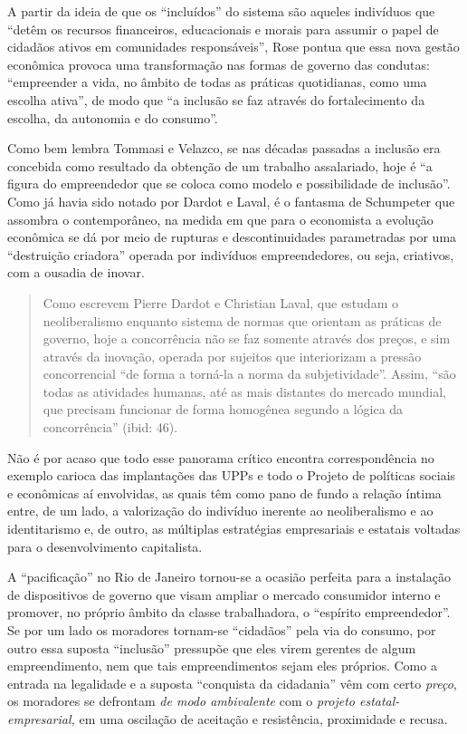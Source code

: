 A partir da ideia de que os ``incluídos'' do sistema são aqueles
indivíduos que ``detêm os recursos financeiros, educacionais e morais
para assumir o papel de cidadãos ativos em comunidades responsáveis'',
Rose pontua que essa nova gestão econômica provoca uma transformação nas
formas de governo das condutas: ``empreender a vida, no âmbito de todas
as práticas quotidianas, como uma escolha ativa'', de modo que ``a
inclusão se faz através do fortalecimento da escolha, da autonomia e do
consumo''.

Como bem lembra Tommasi e Velazco, se nas décadas passadas a inclusão
era concebida como resultado da obtenção de um trabalho assalariado,
hoje é ``a figura do empreendedor que se coloca como modelo e
possibilidade de inclusão''. Como já havia sido notado por Dardot e
Laval, é o fantasma de Schumpeter que assombra o contemporâneo, na
medida em que para o economista a evolução econômica se dá por meio de
rupturas e descontinuidades parametradas por uma ``destruição criadora''
operada por indivíduos empreendedores, ou seja, criativos, com a ousadia
de inovar.

\begin{quote}
Como escrevem Pierre Dardot e Christian Laval, que estudam o
neoliberalismo enquanto sistema de normas que orientam as práticas de
governo, hoje a concorrência não se faz somente através dos preços, e
sim através da inovação, operada por sujeitos que interiorizam a pressão
concorrencial ``de forma a torná-la a norma da subjetividade''. Assim,
``são todas as atividades humanas, até as mais distantes do mercado
mundial, que precisam funcionar de forma homogênea segundo a lógica da
concorrência'' (ibid: 46).
\end{quote}

Não é por acaso que todo esse panorama crítico encontra correspondência
no exemplo carioca das implantações das UPPs e todo o Projeto de
políticas sociais e econômicas aí envolvidas, as quais têm como pano de
fundo a relação íntima entre, de um lado, a valorização do indivíduo
inerente ao neoliberalismo e ao identitarismo e, de outro, as múltiplas
estratégias empresariais e estatais voltadas para o desenvolvimento
capitalista.

A ``pacificação'' no Rio de Janeiro tornou-se a ocasião perfeita para a
instalação de dispositivos de governo que visam ampliar o mercado
consumidor interno e promover, no próprio âmbito da classe trabalhadora,
o ``espírito empreendedor''. Se por um lado os moradores tornam-se
``cidadãos'' pela via do consumo, por outro essa suposta ``inclusão''
pressupõe que eles virem gerentes de algum empreendimento, nem que tais
empreendimentos sejam eles próprios. Como a entrada na legalidade e a
suposta ``conquista da cidadania'' vêm com certo \emph{preço}, os
moradores se defrontam \emph{de modo ambivalente} com o \emph{projeto
estatal-empresarial,} em uma oscilação de aceitação e resistência,
proximidade e recusa.

